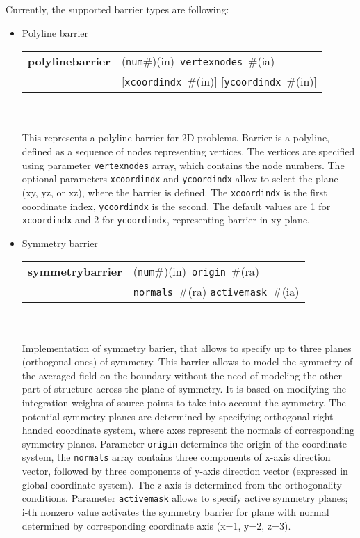 \documentclass[a4paper]{report}
\newcommand{\param}[1]{\texttt{#1}} %
\newcommand{\optional}[1]{[#1]} %
\newcommand{\field}[2]{\param{#1}~\#{\tiny(#2)}} %
\newcommand{\optField}[2]{\optional{\field{#1}{#2}}}
\newcommand{\componentNum}{(\param{num}\#){\tiny(in)}} %
\newcommand{\entKeywordInst}[1]{\textbf{#1}} %
\newenvironment{record}[1][]{\begin{tabular}{|ll}}{\end{tabular}\\}
\newcommand{\recentry}[2]{{#1}&{#2}\\}
\newcounter{rcc}
\newenvironment{record}[1][\textwidth]{\setcounter{rcc}{0}\rowcolors{1}{lightgray}{lightgray}\tabularx{#1}{llR} \hline}
               {\endtabularx}
\newcommand{\recentry}[2]{\ifthenelse{\value{rcc}>0}{$\backslash$ \\}{\setcounter{rcc}{1}}{#1}&{#2}&}
\begin{document}
Currently, the supported barrier types are following:
\begin{itemize}
\item
  Polyline barrier

\begin{record}[0.9\textwidth]
  \recentry{\entKeywordInst{polylinebarrier}}{\componentNum\ \field{vertexnodes}{ia}}
  \recentry{}{\optField{xcoordindx}{in} \optField{ycoordindx}{in}}
\end{record}\\
This represents a polyline barrier for 2D problems. Barrier is a
polyline, defined as a sequence of nodes representing vertices.
The vertices are specified using parameter \param{vertexnodes} array,
which contains the node numbers. The optional parameters
\param{xcoordindx} and \param{ycoordindx} allow to select the plane
(xy, yz, or xz), where the barrier is defined. The \param{xcoordindx} is the
first coordinate index, \param{ycoordindx} is the second. The default values
are 1 for \param{xcoordindx} and 2 for \param{ycoordindx}, representing barrier in xy plane.
\item Symmetry barrier

\begin{record}[0.9\textwidth]
  \recentry{\entKeywordInst{symmetrybarrier}}{\componentNum\ \field{origin}{ra}}
  \recentry{}{\field{normals}{ra} \field{activemask}{ia}}
\end{record}\\
Implementation of symmetry barier, that allows to specify up to three planes (orthogonal ones) of symmetry.
This barrier allows to  model the symmetry of the averaged field on the boundary without
the need of modeling the other part of structure across the plane of symmetry.
It is based on modifying the integration weights of source points to take into account
the symmetry.
The potential symmetry planes are determined by specifying orthogonal right-handed coordinate system,
where axes represent the normals of corresponding symmetry planes.
Parameter \param{origin} determines the origin of the coordinate system, the \param{normals} array
contains three components of x-axis direction vector,
followed by three components of y-axis direction vector (expressed in global coordinate system).
The z-axis is determined from the orthogonality conditions.
Parameter \param{activemask} allows to specify active symmetry planes; i-th nonzero value activates the symmetry barrier for plane
with normal determined by corresponding coordinate axis (x=1, y=2, z=3).
\end{itemize}
\end{document}
